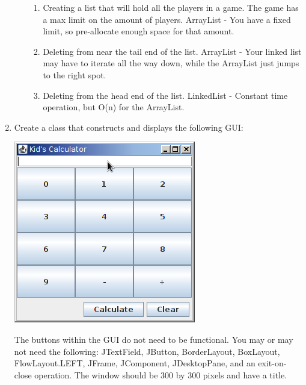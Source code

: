 \documentclass[11pt]{article}
\newenvironment{answer}{\large\lstset{basicstyle=\tiny\ttfamily}\color{white} }{}
\newenvironment{answer}{\large\lstset{basicstyle=\large\ttfamily}\color{red} }{}
\begin{document}
\begin{enumerate}
\begin{enumerate}
\begin{enumerate}
		\item Creating a list that will hold all the players in a game.  The game has a max limit on the amount of players. 
		\begin{answer}
		ArrayList - You have a fixed limit, so pre-allocate enough space for that amount.
		\end{answer}
 
		\item Deleting from near the tail end of the list.
		\begin{answer}
		ArrayList - Your linked list may have to iterate all the way down, while the ArrayList just jumps to the right spot.
		\end{answer}
				
		\item Deleting from the head end of the list.
		\begin{answer}
		LinkedList - Constant time operation, but O(n) for the ArrayList.
		\end{answer}
				
	\end{enumerate}

\end{enumerate}  



\newpage
\item Create a class that constructs and displays the following GUI: \\
\begin{minipage}{0.3\textwidth}
\includegraphics[scale=0.6]{calculator.png}
\end{minipage} \hfill
\hspace{50px}
\begin{minipage}{0.5\textwidth}
The buttons within the GUI do not need to be functional.  You may or may not need the following: JTextField, JButton, BorderLayout, BoxLayout, FlowLayout.LEFT, JFrame, JComponent, JDesktopPane, and an exit-on-close operation.  The window should be 300 by 300 pixels and have a title.
\end{minipage}


\end{enumerate}
\end{document}
